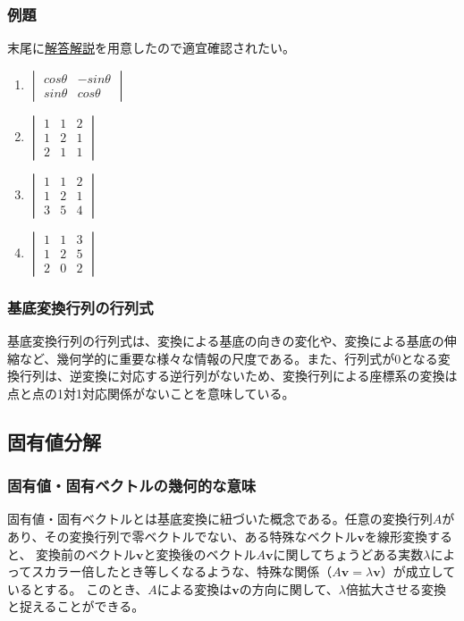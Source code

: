 \documentclass[10pt]{ujarticle}
\begin{document}
\subsubsection{例題}
末尾に\hyperlink{q1}{解答解説}を用意したので適宜確認されたい。
\begin{enumerate}
  \item $\begin{vmatrix} cos\theta & -sin\theta\\ sin\theta & cos\theta \end{vmatrix}$
  \item $\begin{vmatrix} 1 & 1 & 2 \\ 1 & 2 & 1 \\ 2 & 1 & 1 \end{vmatrix}$
  \item $\begin{vmatrix} 1 & 1 & 2 \\ 1 & 2 & 1 \\ 3 & 5 & 4 \end{vmatrix}$
  \item $\begin{vmatrix} 1 & 1 & 3 \\ 1 & 2 & 5 \\ 2 & 0 & 2 \end{vmatrix}$
\end{enumerate}
\subsubsection{基底変換行列の行列式}
基底変換行列の行列式は、変換による基底の向きの変化や、変換による基底の伸縮など、幾何学的に重要な様々な情報の尺度である。また、行列式が0となる変換行列は、逆変換に対応する逆行列がないため、変換行列による座標系の変換は点と点の1対1対応関係がないことを意味している。

\hypertarget{eigen}{\subsection{固有値分解}}
\subsubsection{固有値・固有ベクトルの幾何的な意味}
固有値・固有ベクトルとは基底変換に紐づいた概念である。任意の変換行列$A$があり、その変換行列で零ベクトルでない、ある特殊なベクトル$\mathbf{v}$を線形変換すると、
変換前のベクトル$\mathbf{v}$と変換後のベクトル$A\mathbf{v}$に関してちょうどある実数$\lambda$によってスカラー倍したとき等しくなるような、特殊な関係（$A\mathbf{v}=\lambda\mathbf{v}$）が成立しているとする。
このとき、$A$による変換は$\mathbf{v}$の方向に関して、$\lambda$倍拡大させる変換と捉えることができる。
\end{document}
